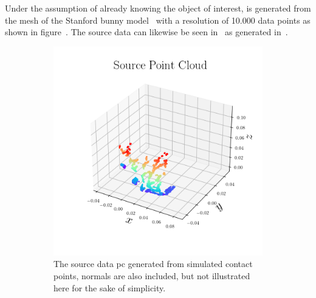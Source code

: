 Under the assumption of already knowing the object of interest,  is generated from the mesh of the Stanford bunny model~\cite{stanford-bunny} with a resolution of \num{10,000} data points as shown in figure~. The source data  can likewise be seen in~ as generated in~. \medskip

\begin{figure}[!h]
	\centering
	\begin{subfigure}[b]{0.48\textwidth}
		\centering
		\includegraphics[width=\textwidth]{chapters/1-tactile-perception/fig/matplotlib/pc_source.png}
		\caption{The source data  \gls{pc} generated from simulated contact points, normals are also included, but not illustrated here for the sake of simplicity.}
		\label{fig:pe-pc-source}
	\end{subfigure}
	\begin{subfigure}[b]{0.48\textwidth}
		\centering

\end{subfigure}
\end{figure}
